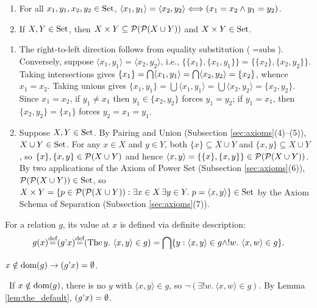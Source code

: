 \documentclass[10pt,a4paper]{article}
\begin{document}
\begin{lemma}\label{lem:pair_prop}
\begin{enumerate}
\item For all $x_1, y_1, x_2, y_2 \in {\textrm{Set}}$, $\langle x_1, y_1 \rangle = \langle x_2, y_2 \rangle \Longleftrightarrow (x_1 = x_2 \land y_1 = y_2)$.
\item If $X, Y \in {\textrm{Set}}$, then $X \times Y \subseteq {\mathcal{P}}({\mathcal{P}}(X \cup Y))$ and $X \times Y \in {\textrm{Set}}$.
\end{enumerate}
\end{lemma}
\myprf
\begin{enumerate}
\item The right-to-left direction follows from equality substitution ($=\textrm{subs}$). Conversely, suppose $\langle x_1, y_1 \rangle = \langle x_2, y_2 \rangle$, i.e., $\{\{x_1\}, \{x_1, y_1\}\} = \{\{x_2\}, \{x_2, y_2\}\}$. Taking intersections gives $\{x_1\} = {\bigcap} \langle x_1, y_1 \rangle = {\bigcap} \langle x_2, y_2 \rangle = \{x_2\}$, whence $x_1 = x_2$. Taking unions gives $\{x_1, y_1\} = \bigcup \langle x_1, y_1 \rangle = \bigcup \langle x_2, y_2 \rangle = \{x_2, y_2\}$. Since $x_1 = x_2$, if $y_1 \neq x_1$ then $y_1 \in \{x_2, y_2\}$ forces $y_1 = y_2$; if $y_1 = x_1$, then $\{x_2, y_2\} = \{x_1\}$ forces $y_2 = x_1 = y_1$.
\item Suppose $X, Y \in {\textrm{Set}}$. By Pairing and Union (Subsection \ref{sec:axioms}(4)--(5)), $X \cup Y \in {\textrm{Set}}$. For any $x \in X$ and $y \in Y$, both $\{x\} \subseteq X \cup Y$ and $\{x, y\} \subseteq X \cup Y$, so $\{x\}, \{x, y\} \in {\mathcal{P}}(X \cup Y)$ and hence $\langle x, y \rangle = \{\{x\}, \{x, y\}\} \in {\mathcal{P}}({\mathcal{P}}(X \cup Y))$. By two applications of the Axiom of Power Set (Subsection \ref{sec:axioms}(6)), ${\mathcal{P}}({\mathcal{P}}(X \cup Y)) \in {\textrm{Set}}$, so $X \times Y = \{p \in {\mathcal{P}}({\mathcal{P}}(X \cup Y)) : \exists x \in X\, \exists y \in Y.\ p = \langle x, y \rangle\} \in {\textrm{Set}}$ by the Axiom Schema of Separation (Subsection \ref{sec:axioms}(7)).
\end{enumerate}
\myqed

For a relation $g$, its value at $x$ is defined via definite description:
$$g(x) {\stackrel{{\textrm{def}}}{=}} (g{\textrm{'}} x) {\stackrel{{\textrm{def}}}{=}} ({\textrm{The\,}} y.\ \langle x, y\rangle \in g) = {\bigcap} \{y : \langle x,y\rangle \in g \land !w.\ \langle x,w\rangle \in g\}.$$

\begin{exercise}
$x\notin {\textrm{dom}}(g)\to (g{\textrm{'}} x)=\emptyset$.
\end{exercise}
\myprf\ If $x \notin {\textrm{dom}}(g)$, there is no $y$ with $\langle x,y\rangle \in g$, so $\neg(\exists !w.\ \langle x,w\rangle \in g)$. By Lemma \ref{lem:the_default}, $(g{\textrm{'}} x) = \emptyset$. \myqed
\end{document}
